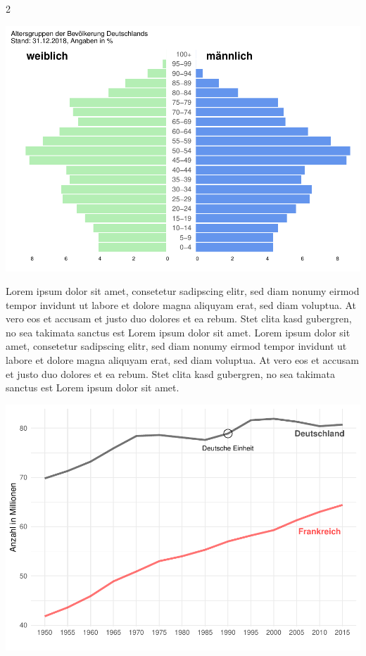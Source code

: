\documentclass[
  a4paper,
  twoside]{article}
\begin{document}
\begin {multicols}{2}
\columnbreak

\includegraphics[width=1\linewidth]{2021-03-02_Beispiel_files/figure-latex/plot Pyramide 2-spaltig-1}

Lorem ipsum dolor sit amet, consetetur sadipscing elitr, sed diam nonumy
eirmod tempor invidunt ut labore et dolore magna aliquyam erat, sed diam
voluptua. At vero eos et accusam et justo duo dolores et ea rebum. Stet
clita kasd gubergren, no sea takimata sanctus est Lorem ipsum dolor sit
amet. Lorem ipsum dolor sit amet, consetetur sadipscing elitr, sed diam
nonumy eirmod tempor invidunt ut labore et dolore magna aliquyam erat,
sed diam voluptua. At vero eos et accusam et justo duo dolores et ea
rebum. Stet clita kasd gubergren, no sea takimata sanctus est Lorem
ipsum dolor sit amet.

\includegraphics[width=1\linewidth]{2021-03-02_Beispiel_files/figure-latex/unnamed-chunk-2-1}

\end {multicols}
\end{document}
